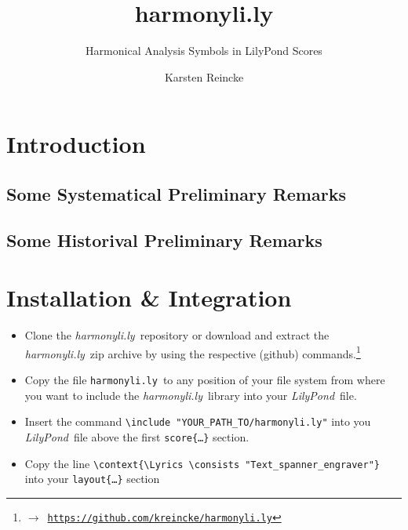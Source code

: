 \documentclass[
  DIV=calc,
  BCOR=5mm,
  12pt,
  headings=small,
  oneside,
  abstract=true,
  toc=bib,
  xcolor=dvipsnames,
  openany,
  ngerman,english]{scrartcl}
\newcommand{\ra}[0]{$\rightarrow$}
\newcommand{\lnkr}[1]{\ra\ \href{#1}{\texttt{#1}}}
\newcommand{\hlyn}[0]{\textit{harmonyli.ly}}
\newcommand{\hlyf}[0]{\texttt{harmonyli.ly}}
\newcommand{\lily}[0]{\textit{LilyPond}}
\begin{document}
\nocite{*}

\titlehead{Tutorial}
\subject{Release }
\title{harmonyli.ly}
\subtitle{Harmonical Analysis Symbols in LilyPond Scores}
\author{Karsten Reincke}


\maketitle

\footnotesize
\tableofcontents

\normalsize

\section{Introduction}
\subsection{Some Systematical Preliminary Remarks}
\subsection{Some Historival Preliminary Remarks}

\section{Installation \& Integration}
\begin{itemize}
  \item Clone the \hlyn\ repository or download and extract the \hlyn\ zip
  archive by using the respective (github)
  commands.\footnote{\lnkr{https://github.com/kreincke/harmonyli.ly}}
  \item Copy the file \hlyf\ to any position of your file system from where you
  want to include the \hlyn\ library into your \lily\ file.
  \item Insert the command \texttt{\textbackslash include 
  "YOUR\_PATH\_TO/harmonyli.ly"} into
  you \lily\ file above the first \texttt{score\{\ldots\}} section.
  \item Copy the line \verb|\context{\Lyrics \consists "Text_spanner_engraver"}|
  into your \texttt{layout\{\ldots\}} section
\end{itemize}
\end{document}
